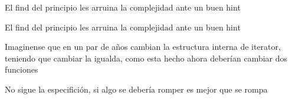 \begin{DoxyRefList}
El find del principio les arruina la complejidad ante un buen hint

El find del principio les arruina la complejidad ante un buen hint 
\item[\label{deprecated__deprecated000023}%
\hypertarget{deprecated__deprecated000023}{}%
Miembro \hyperlink{classaed2_1_1map_1_1iterator_a836c7a166d63f507c4f79085ae953c51_a836c7a166d63f507c4f79085ae953c51}{aed2\+:\+:map$<$ Key, Meaning, Compare $>$\+:\+:iterator\+:\+:operator!=} (iterator other) const ]Imaginense que en un par de años cambian la estructura interna de iterator, teniendo que cambiar la igualda, como esta hecho ahora deberían cambiar dos funciones 
\item[\label{deprecated__deprecated000021}%
\hypertarget{deprecated__deprecated000021}{}%
Miembro \hyperlink{classaed2_1_1map_1_1iterator_a7c44de7f0508186e135ddbcfe782fec5_a7c44de7f0508186e135ddbcfe782fec5}{aed2\+:\+:map$<$ Key, Meaning, Compare $>$\+:\+:iterator\+:\+:operator++} ()]No sigue la especifición, si algo se debería romper es mejor que se rompa 


\end{DoxyRefList}
